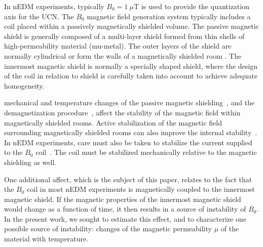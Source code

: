 \documentclass[review]{elsarticle}
\begin{document}

In nEDM experiments, typically $B_0=1~\mu$T is used to provide the
quantization axis for the UCN.
The $B_0$ magnetic field generation system typically includes a coil
placed within a passively magnetically shielded volume.  The passive
magnetic shield is generally composed of a multi-layer shield formed
from thin shells of high-permeability material (mu-metal).  The outer
layers of the shield are normally cylindrical \cite{bib:nedm3.5, bib:
  nedm2 } or form the walls of a magnetically shielded room
\cite{bib:altarev2014}.  The innermost magnetic shield is normally a
specially shaped shield, where the design of the coil in relation to
shield is carefully taken into account to achieve adequate
homogeneity.


mechanical and temperature changes of the passive magnetic
shielding~\cite{bib:voigt,bib:thiel}, and the demagnetization
procedure~\cite{bib:thiel,bib:fierlinger2016}, affect the stability of
the magnetic field within magnetically shielded
rooms.
Active stabilization of the magnetic field surrounding magnetically
shielded rooms can also improve the internal
stability~\cite{bib:franke,bib:voigt, bib:afach}.  In nEDM
experiments, care must also be taken to stabilize the current supplied
to the $B_0$ coil~\cite{bib:brys}. The coil must be stabilized
mechanically relative to the magnetic shielding as well.



One additional affect, which is the subject of this paper, relates to
the fact that the $B_0$ coil in most nEDM experiments is magnetically
coupled to the innermost magnetic shield.  If the magnetic properties
of the innermost magnetic shield would change as a function of time,
it then results in a source of instability of $B_0$.  In the present
work, we sought to estimate this effect, and to characterize one
possible source of instability: changes of the magnetic permeability
$\mu$ of the material with temperature.
\end{document}
